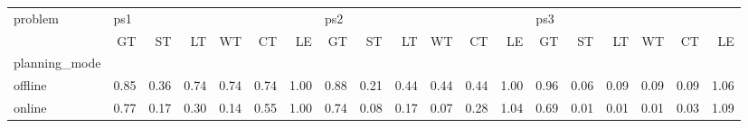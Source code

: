 \begin{tabular}{lrrrrrrrrrrrrrrrrrr}
\toprule
problem & \multicolumn{6}{l}{ps1} & \multicolumn{6}{l}{ps2} & \multicolumn{6}{l}{ps3} \\
{} &   GT &   ST &   LT &   WT &   CT &   LE &   GT &   ST &   LT &   WT &   CT &   LE &   GT &   ST &   LT &   WT &   CT &   LE \\
planning\_mode &      &      &      &      &      &      &      &      &      &      &      &      &      &      &      &      &      &      \\
\midrule
offline       & 0.85 & 0.36 & 0.74 & 0.74 & 0.74 & 1.00 & 0.88 & 0.21 & 0.44 & 0.44 & 0.44 & 1.00 & 0.96 & 0.06 & 0.09 & 0.09 & 0.09 & 1.06 \\
online        & 0.77 & 0.17 & 0.30 & 0.14 & 0.55 & 1.00 & 0.74 & 0.08 & 0.17 & 0.07 & 0.28 & 1.04 & 0.69 & 0.01 & 0.01 & 0.01 & 0.03 & 1.09 \\
\bottomrule
\end{tabular}
